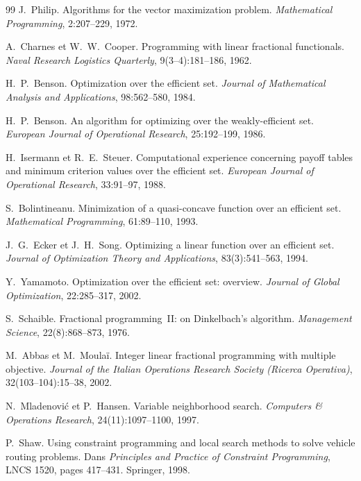 \documentclass[11pt,a4paper]{article}
\theoremstyle{plain}
\theoremstyle{remark}
\begin{document}
\begin{thebibliography}{99}
J.~Philip.
\newblock Algorithms for the vector maximization problem.
\newblock \emph{Mathematical Programming}, 2:207--229, 1972.

A.~Charnes et W.~W.~Cooper.
\newblock Programming with linear fractional functionals.
\newblock \emph{Naval Research Logistics Quarterly}, 9(3--4):181--186, 1962.

H.~P.~Benson.
\newblock Optimization over the efficient set.
\newblock \emph{Journal of Mathematical Analysis and Applications},
  98:562--580, 1984.

H.~P.~Benson.
\newblock An algorithm for optimizing over the weakly-efficient set.
\newblock \emph{European Journal of Operational Research}, 25:192--199,
  1986.

H.~Isermann et R.~E.~Steuer.
\newblock Computational experience concerning payoff tables and minimum
  criterion values over the efficient set.
\newblock \emph{European Journal of Operational Research}, 33:91--97, 1988.

S.~Bolintineanu.
\newblock Minimization of a quasi-concave function over an efficient set.
\newblock \emph{Mathematical Programming}, 61:89--110, 1993.

J.~G.~Ecker et J.~H.~Song.
\newblock Optimizing a linear function over an efficient set.
\newblock \emph{Journal of Optimization Theory and Applications},
  83(3):541--563, 1994.

Y.~Yamamoto.
\newblock Optimization over the efficient set: overview.
\newblock \emph{Journal of Global Optimization}, 22:285--317, 2002.

S.~Schaible.
\newblock Fractional programming~II: on Dinkelbach's algorithm.
\newblock \emph{Management Science}, 22(8):868--873, 1976.

M.~Abbas et M.~Moulaï.
\newblock Integer linear fractional programming with multiple objective.
\newblock \emph{Journal of the Italian Operations Research Society
  (Ricerca Operativa)}, 32(103--104):15--38, 2002.

N.~Mladenović et P.~Hansen.
\newblock Variable neighborhood search.
\newblock \emph{Computers \& Operations Research}, 24(11):1097--1100, 1997.

P.~Shaw.
\newblock Using constraint programming and local search methods to solve
  vehicle routing problems.
\newblock Dans \emph{Principles and Practice of Constraint Programming},
  LNCS 1520, pages 417--431. Springer, 1998.


\end{thebibliography}
\end{document}
